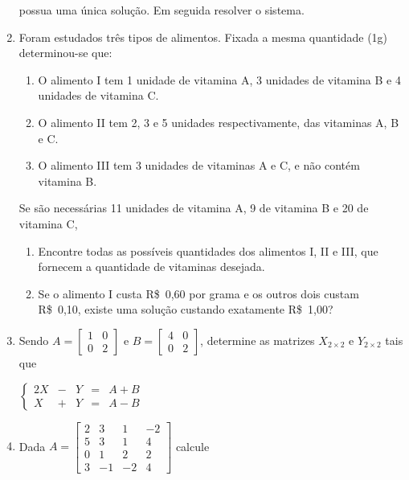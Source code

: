 \documentclass{article}
\begin{document}
\begin{enumerate}
possua uma \'unica solu\c{c}\~ao. Em seguida resolver o sistema.

\item Foram estudados tr\^es tipos de alimentos. Fixada a mesma quantidade (1g)
	determinou-se que:

\begin{enumerate}[label=\roman*.]
	\item O alimento I tem 1 unidade de vitamina A, 3 unidades de vitamina B e
		4 unidades de vitamina C.
	\item O alimento II tem 2, 3 e 5 unidades respectivamente, das vitaminas A,
		B e C.
	\item O alimento III tem 3 unidades de vitaminas A e C, e n\~ao cont\'em
		vitamina B.
\end{enumerate}

Se s\~ao necess\'arias 11 unidades de vitamina A, 9 de vitamina B e 20 de vitamina C,

\begin{enumerate}[label=\alph*.]
	\item Encontre todas as poss\'iveis quantidades dos alimentos I, II e III,
		que fornecem a quantidade de vitaminas desejada.
	\item Se o alimento I custa R\$~0,60 por grama e os outros dois custam
		R\$~0,10, existe uma solu\c{c}\~ao custando exatamente R\$~1,00?
\end{enumerate}


\item Sendo
$A = \left[\begin{array}{cc}
	1 & 0 \\
	0 & 2
\end{array}\right]$ e 
$B = \left[\begin{array}{cc}
	4 & 0 \\
	0 & 2
\end{array}\right]$,
determine as matrizes $X_{2\times{} 2}$ e $Y_{2\times{} 2}$ tais que 

$\left\{\begin{array}{ccccl}
	2X & - & Y & = & A + B \\
	X & + & Y & = & A - B
\end{array}\right.$

\item Dada $A = 
	\left[\begin{array}{cccc}
		2 & 3 & 1 & -2 \\
		5 & 3 & 1 & 4 \\
		0 & 1 & 2 & 2 \\
		3 & -1 & -2 & 4
	\end{array} \right]$
calcule


\end{enumerate}
\end{document}
